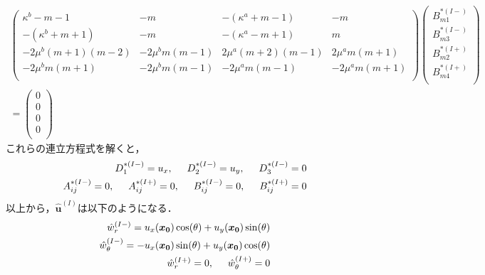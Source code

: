 \begin{align}
	\left(
	\begin{array}{cccc}
		\kappa^b-m-1& -m & -(\kappa^a+m-1) & -m \\
		-(\kappa^b+m+1) & -m & -(\kappa^a-m+1) & m \\
		-2\mu^{b}(m+1)(m-2) & -2\mu^{b}m(m-1) &
		2\mu^{a}(m+2)(m-1) & 2\mu^{a}m(m+1) \\
		-2\mu^{b}m(m+1) & -2\mu^{b}m(m-1) &
		-2\mu^{a}m(m-1) & -2\mu^{a}m(m+1) \\
	\end{array}
	\right)
	\left(
	\begin{array}{c}
		B_{m1}^{*(I-)} \\
	 	B_{m3}^{*(I-)} \\
		B_{m2}^{*(I+)}\\
	 	B_{m4}^{*(I+)} \\
	\end{array}
	\right)
	\nonumber
	\\
	=
	\left(
	\begin{array}{c}
		0 \\
	 	0 \\
		0 \\
	 	0 \\
	\end{array}
	\right)
\end{align}
これらの連立方程式を解くと，
\begin{align}
	D_{1}^{*(I-)}=u_{x},\hspace{0.5cm}D_{2}^{*(I-)}=u_{y},\hspace{0.5cm}D_{3}^{*(I-)}=0
	\nonumber
	\\
	A_{ij}^{*(I-)}=0,\hspace{0.5cm}A_{ij}^{*(I+)}=0,\hspace{0.5cm}
	B_{ij}^{*(I-)}=0,\hspace{0.5cm}B_{ij}^{*(I+)}=0
\end{align}
以上から，$\hat{\bm{u}}^{(I)}$は以下のようになる．
\begin{align}
	\hat{w}_{r}^{(I-)}=u_{x}(\bm{x_{0}})\cos(\theta)+u_{y}(\bm{x_{0}})\sin(\theta)
	\nonumber
	\\
	\hat{w}_{\theta}^{(I-)}=-u_{x}(\bm{x_{0}})\sin(\theta)+u_{y}(\bm{x_{0}})\cos(\theta)
	\nonumber
	\\
	\hat{w}_{r}^{(I+)}=0,\hspace{0.5cm}\hat{w}_{\theta}^{(I+)}=0
\end{align}

\newpage

